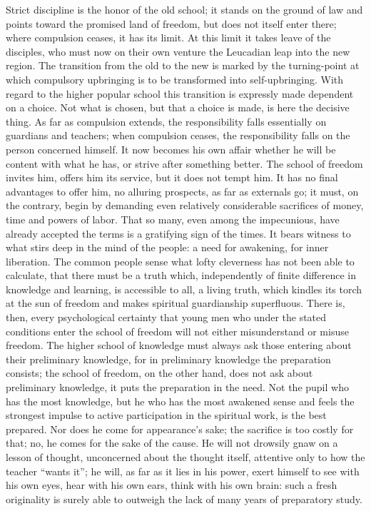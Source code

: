 \documentclass[12pt,a4paper,openany]{book}
\newcommand{\opage}[1]{\marginnote{\footnotesize\textit{[#1]}}}
\begin{document}
Strict discipline is the honor of the old school;
it stands on the ground of law and points toward the promised
land of freedom, but does not itself enter there; where
compulsion ceases, it has its limit. At this
limit it takes leave of the disciples, who must now
on their own venture the Leucadian leap into the
new region. The transition from the old to the new is
marked by the turning-point at which compulsory upbringing
is to be transformed into self-upbringing. With regard to the
higher popular school this transition is expressly made
dependent on a choice. Not what is chosen, but that
a choice is made, is here the decisive thing. As far as
compulsion extends, the responsibility falls essentially on guardians
and teachers; when compulsion ceases, the responsibility falls
on the person concerned himself. It now becomes his
own affair whether he will be content with what he has, or
\setcounter{footnote}{0}%
\opage{417}strive after something better. The school of freedom invites him,
offers him its service, but it does not tempt him.
It has no final advantages to offer him, no
alluring prospects, as far as externals go; it
must, on the contrary, begin by demanding even relatively
considerable sacrifices of money, time and powers of labor.
That so many, even among the impecunious, have already
accepted the terms is a gratifying sign of the
times. It bears witness to what stirs deep in the mind
of the people: a need for awakening, for inner liberation.
The common people sense what lofty cleverness
has not been able to calculate, that there must be a truth
which, independently of finite difference in knowledge and learning,
is accessible to all, a living truth, which
kindles its torch at the sun of freedom and makes spiritual
guardianship superfluous. There is, then, every psychological
certainty that young men who under the stated
conditions enter the school of freedom will not either
misunderstand or misuse freedom. The higher school of knowledge
must always ask those entering about their preliminary knowledge,
for in preliminary knowledge the preparation consists;
the school of freedom, on the other hand, does not ask about preliminary knowledge,
it puts the preparation in the need. Not
the pupil who has the most knowledge, but he who
has the most awakened sense and feels the strongest impulse
to active participation in the spiritual work,
is the best prepared. Nor does he come
for appearance's sake; the sacrifice is too costly for that;
no, he comes for the sake of the cause. He will not drowsily
gnaw on a lesson of thought, unconcerned about the thought
itself, attentive only to how the teacher ``wants
\setcounter{footnote}{0}%
\opage{418}it''; he will, as far as it lies in his power, exert
himself to see with his own eyes, hear with his own ears,
think with his own brain: such a fresh originality is
surely able to outweigh the lack of many years of preparatory study.
\end{document}
